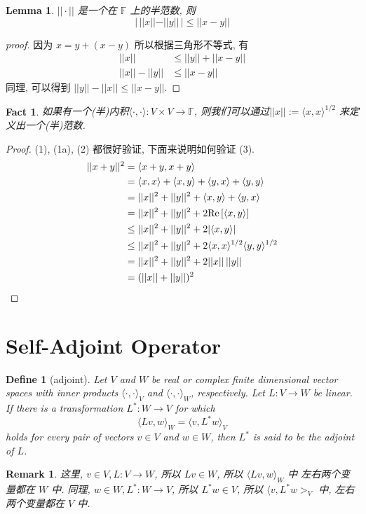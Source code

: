 \documentclass{article}
\newtheorem{define}{Define}
\newtheorem{fact}{Fact}
\newtheorem{lemma}{Lemma}
\newtheorem{remark}{Remark}
\def\<{\langle}
\def\>{\rangle}
\begin{document}
\begin{lemma}
  $||\cdot||$ 是一个在 $\mathbb{F}$ 上的半范数, 则 
  \[|\,||x|| - ||y||\,| \leq ||x - y||\]
\end{lemma}
\begin{proof}[proof]
  因为 $x = y + (x  - y)$ 所以根据三角形不等式, 有
  \begin{align*}
    ||x|| &\leq ||y|| + ||x - y|| \\
    ||x|| - ||y|| &\leq ||x - y||
  \end{align*}
  同理, 可以得到 $||y|| - ||x|| \leq ||x - y||$.
\end{proof}

\begin{fact}
  如果有一个(半)内积$\<\cdot, \cdot\>: V\times V\to\mathbb{F}$, 则我们可以通过$||x||:= \<x,x\>^{1/2}$ 来定义出一个(半)范数.
\end{fact}
\begin{proof}
  (1), (1a), (2) 都很好验证, 下面来说明如何验证 (3).
  \begin{align*}
    ||x + y||^2 &= \<x + y, x + y\> \\
                &= \<x, x\> + \<x, y\> + \<y, x\> + \<y, y\> \\
                &= ||x||^2 + ||y||^2 + \<x, y\> + \<y, x\> \\
                &= ||x||^2 + ||y||^2 + 2\mathrm{Re}\left[\<x, y\>\right] \\
                &\leq ||x||^2 + ||y||^2 + 2|\<x, y\>| \\
                &\leq ||x||^2 + ||y||^2 + 2\<x,x\>^{1/2}\<y,y\>^{1/2} \\
                &= ||x||^2 + ||y||^2 + 2||x||\,||y|| \\
                &= (||x|| + ||y||)^2 \qedhere
  \end{align*}
\end{proof}

\section{Self-Adjoint Operator}
\begin{define}[adjoint]
  Let $V$ and $W$ be real or complex finite dimensional vector spaces with inner
  products $\<\cdot,\cdot\>_V$ and $\<\cdot,\cdot\>_W$, respectively.
  Let $L: V\to W$ be linear. If there is a transformation $L^*:W\to V$ for which
  \begin{equation}
    \<Lv, w\>_W = \<v, L^*w\>_V\label{eq:def-adjoint}
  \end{equation}
  holds for every pair of vectors $v\in V$ and $w\in W$, then $L^*$ is said to be the \emph{adjoint} of $L$.
\end{define}
\begin{remark}
  这里, $v\in V, L:V\to W$, 所以 $Lv\in W$, 所以 $\<Lv, w\>_W$ 中 左右两个变量都在 $W$  中.
  同理, $w\in W, L^*:W\to V$, 所以 $L^*w\in V$, 所以 $\<v, L^*w>_V$ 中,  左右两个变量都在 $V$ 中.
\end{remark}
\end{document}
